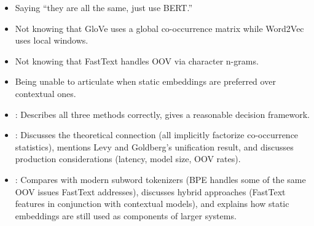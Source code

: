 \begin{interviewq}
\redflags
\begin{itemize}
    \item Saying ``they are all the same, just use BERT.''
    \item Not knowing that GloVe uses a global co-occurrence matrix while
    Word2Vec uses local windows.
    \item Not knowing that FastText handles OOV via character n-grams.
    \item Being unable to articulate when static embeddings are preferred
    over contextual ones.
\end{itemize}


\goodgreat
\begin{itemize}
    \item {}: Describes all three methods correctly, gives a
    reasonable decision framework.
    \item {}: Discusses the theoretical connection (all implicitly
    factorize co-occurrence statistics), mentions Levy and Goldberg's
    unification result, and discusses production considerations (latency,
    model size, OOV rates).
    \item {}: Compares with modern subword tokenizers (BPE
    handles some of the same OOV issues FastText addresses), discusses
    hybrid approaches (FastText features in conjunction with contextual
    models), and explains how static embeddings are still used as components
    of larger systems.
\end{itemize}

\end{interviewq}

\vspace{0.5em}

